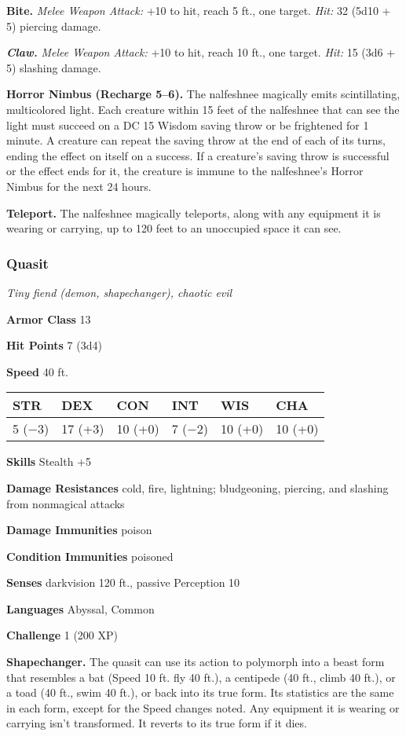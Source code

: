 \documentclass[
]{article}
\begin{document}
\textbf{Bite.} \emph{Melee Weapon Attack:} +10 to hit, reach 5 ft., one
target. \emph{Hit:} 32 (5d10 + 5) piercing damage.

\emph{\textbf{Claw.}} \emph{Melee Weapon Attack:} +10 to hit, reach 10
ft., one target. \emph{Hit:} 15 (3d6 + 5) slashing damage.

\textbf{Horror Nimbus (Recharge 5--6).} The nalfeshnee magically emits
scintillating, multicolored light. Each creature within 15 feet of the
nalfeshnee that can see the light must succeed on a DC 15 Wisdom saving
throw or be frightened for 1 minute. A creature can repeat the saving
throw at the end of each of its turns, ending the effect on itself on a
success. If a creature's saving throw is successful or the effect ends
for it, the creature is immune to the nalfeshnee's Horror Nimbus for the
next 24 hours.

\textbf{Teleport.} The nalfeshnee magically teleports, along with any
equipment it is wearing or carrying, up to 120 feet to an unoccupied
space it can see.

\hypertarget{quasit}{%
\subsubsection{Quasit}\label{quasit}}

\emph{Tiny fiend (demon, shapechanger), chaotic evil}

\textbf{Armor Class} 13

\textbf{Hit Points} 7 (3d4)

\textbf{Speed} 40 ft.

\begin{longtable}[]{@{}llllll@{}}
\toprule
STR & DEX & CON & INT & WIS & CHA\tabularnewline
\midrule
\endhead
5 (−3) & 17 (+3) & 10 (+0) & 7 (−2) & 10 (+0) & 10 (+0)\tabularnewline
\bottomrule
\end{longtable}

\textbf{Skills} Stealth +5

\textbf{Damage Resistances} cold, fire, lightning; bludgeoning,
piercing, and slashing from nonmagical attacks

\textbf{Damage Immunities} poison

\textbf{Condition Immunities} poisoned

\textbf{Senses} darkvision 120 ft., passive Perception 10

\textbf{Languages} Abyssal, Common

\textbf{Challenge} 1 (200 XP)

\textbf{Shapechanger.} The quasit can use its action to polymorph into a
beast form that resembles a bat (Speed 10 ft. fly 40 ft.), a centipede
(40 ft., climb 40 ft.), or a toad (40 ft., swim 40 ft.), or back into
its true form. Its statistics are the same in each form, except for the
Speed changes noted. Any equipment it is wearing or carrying isn't
transformed. It reverts to its true form if it dies.
\end{document}
